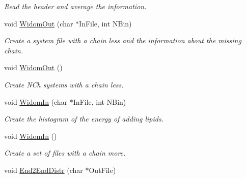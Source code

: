 \begin{DoxyCompactItemize}
\begin{DoxyCompactList}\small\item\em \-Read the header and average the information. \end{DoxyCompactList}\item 
\hypertarget{classElPoly_aa7a92147aff6a466398908e0f92ca139}{void \hyperlink{classElPoly_aa7a92147aff6a466398908e0f92ca139}{\-Widom\-Out} (char $\ast$\-In\-File, int \-N\-Bin)}\label{classElPoly_aa7a92147aff6a466398908e0f92ca139}

\begin{DoxyCompactList}\small\item\em \-Create a system file with a chain less and the information about the missing chain. \end{DoxyCompactList}\item 
\hypertarget{classElPoly_ab6f6a1fc647dcd4684fcaa667d612099}{void \hyperlink{classElPoly_ab6f6a1fc647dcd4684fcaa667d612099}{\-Widom\-Out} ()}\label{classElPoly_ab6f6a1fc647dcd4684fcaa667d612099}

\begin{DoxyCompactList}\small\item\em \-Create \-N\-Ch systems with a chain less. \end{DoxyCompactList}\item 
\hypertarget{classElPoly_a3e5c7ada1f6d5a2d37b23a9fb12771f9}{void \hyperlink{classElPoly_a3e5c7ada1f6d5a2d37b23a9fb12771f9}{\-Widom\-In} (char $\ast$\-In\-File, int \-N\-Bin)}\label{classElPoly_a3e5c7ada1f6d5a2d37b23a9fb12771f9}

\begin{DoxyCompactList}\small\item\em \-Create the histogram of the energy of adding lipids. \end{DoxyCompactList}\item 
\hypertarget{classElPoly_a2fbe8fbc91f83f0ac7a947965a3c38b8}{void \hyperlink{classElPoly_a2fbe8fbc91f83f0ac7a947965a3c38b8}{\-Widom\-In} ()}\label{classElPoly_a2fbe8fbc91f83f0ac7a947965a3c38b8}

\begin{DoxyCompactList}\small\item\em \-Create a set of files with a chain more. \end{DoxyCompactList}\item 
\hypertarget{classElPoly_a15ee2b235143aabc133fe974aa3258a2}{void \hyperlink{classElPoly_a15ee2b235143aabc133fe974aa3258a2}{\-End2\-End\-Distr} (char $\ast$\-Out\-File)}\label{classElPoly_a15ee2b235143aabc133fe974aa3258a2}


\end{DoxyCompactItemize}
